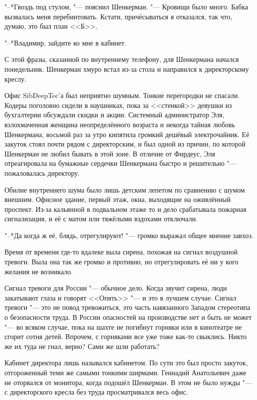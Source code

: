 "--*Гвоздь под стулом, "--- пояснил Шенкерман.
"--- Кровищи было много.
Бабка вызвалась меня перебинтовать.
Кстати, причёсываться я отказался, так что, думаю, это был план <<Б>>.

\asterism

\label{Mon_2012_07_09}

"--*Владимир, зайдите ко мне в кабинет.

С этой фразы, сказанной по внутреннему телефону, для Шенкермана начался понедельник.
Шенкерман хмуро встал из-за стола и направился к директорскому креслу.

Офис SibDeepTec'а был неприятно шумным.
Тонкие перегородки не спасали.
Кодеры поголовно сидели в наушниках, пока за <<стенкой>> девушки из бухгалтерии обсуждали скидки и акции.
Системный администратор Эля, взлохмаченная женщина неопределённого возраста и некогда тайная любовь Шенкермана, восьмой раз за утро кипятила громкий дешёвый электрочайник.
Её закуток стоял почти рядом с директорским, и был одной из причин, по которой Шенкерман не любил бывать в этой зоне.
В отличие от Фирдеус, Эля отреагировала на бумажные сердечки Шенкермана быстро и решительно "--- пожаловалась директору.

Обилие внутреннего шума было лишь детским лепетом по сравнению с шумом внешним.
Офисное здание, первый этаж, окна, выходящие на оживлённый проспект.
Из-за кальянной в подвальном этаже то и дело срабатывала пожарная сигнализация, и её с матом или тяжёлыми вздохами отключали.

"--*Да когда ж её, блядь, отрегулируют! "--- громко выражал общее мнение завхоз.

Время от времени где-то вдалеке выла сирена, похожая на сигнал воздушной тревоги.
Выла она так же громко и противно, но отрегулировать её ни у кого желания не возникало.

Сигнал тревоги для России "--- обычное дело.
Когда звучит сирена, люди закатывают глаза и говорят <<Опять>> "--- и это в лучшем случае.
Сигнал тревоги "--- это не повод тревожиться, это часть навязанного Западом стереотипа о безопасности труда.
В России опасностей на производстве нет и быть не может "--- во всяком случае, пока на шахте не погибнут горняки или в кинотеатре не сгорит сотня детей.
Впрочем, с горняками все уже тоже как-то свыклись.
Никто же их туда не гнал, верно?
Сами же шли работать?

Кабинет директора лишь назывался кабинетом.
По сути это был просто закуток, отгороженный теми же самыми тонкими ширмами.
Геннадий Анатольевич даже не оторвался от монитора, когда подошёл Шенкерман.
В этом не было нужды "--- с директорского кресла без труда просматривался весь офис.

